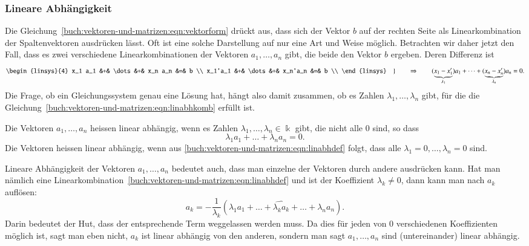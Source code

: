 \subsubsection{Lineare Abhängigkeit}
Die Gleichung~\eqref{buch:vektoren-und-matrizen:eqn:vektorform}
drückt aus, dass sich der Vektor $b$ auf der rechten Seite als
Linearkombination der Spaltenvektoren ausdrücken lässt.
Oft ist eine solche Darstellung auf nur eine Art und Weise möglich.
Betrachten wir daher jetzt den Fall, dass es zwei verschiedene
Linearkombinationen der Vektoren $a_1,\dots,a_n$ gibt, die beide den
Vektor $b$ ergeben.
Deren Differenz ist
\begin{equation}
\left.
\begin{linsys}{4}
x_1 a_1 &+& \dots &+& x_n a_n &=& b \\
x_1'a_1 &+& \dots &+& x_n'a_n &=& b \\
\end{linsys}
\quad\right\}
\qquad
\Rightarrow
\qquad
(\underbrace{x_1-x_1'}_{\lambda_1}) a_1
+
\dots
+
(\underbrace{x_n-x_n'}_{\lambda_n}) a_n
=
0.
\label{buch:vektoren-und-matrizen:eqn:linabhkomb}
\end{equation}
Die Frage, ob ein Gleichungssystem genau eine Lösung hat, hängt also
damit zusammen, ob es Zahlen $\lambda_1,\dots,\lambda_n$ gibt, für
die die Gleichung~\eqref{buch:vektoren-und-matrizen:eqn:linabhkomb}
erfüllt ist.

\begin{definition}
Die Vektoren $a_1,\dots,a_n$ heissen linear abhängig, wenn es Zahlen
$\lambda_1,\dots,\lambda_n\in\Bbbk$ gibt, die nicht alle $0$ sind, so dass
\begin{equation}
\lambda_1a_1+\dots+\lambda_na_n = 0.
\label{buch:vektoren-und-matrizen:eqn:linabhdef}
\end{equation}
Die Vektoren heissen linear abhängig, wenn aus
\eqref{buch:vektoren-und-matrizen:eqn:linabhdef}
folgt, dass alle $\lambda_1=0,\dots,\lambda_n=0$ sind.
\end{definition}

Lineare Abhängigkeit der Vektoren $a_1,\dots,a_n$ bedeutet auch, dass
man einzelne der Vektoren durch andere ausdrücken kann.
Hat man nämlich eine
Linearkombination~\eqref{buch:vektoren-und-matrizen:eqn:linabhdef} und
ist der Koeffizient $\lambda_k\ne 0$, dann kann man nach $a_k$ auflösen:
\[
a_k = -\frac{1}{\lambda_k}(\lambda_1a_1+\dots+\widehat{\lambda_ka_k}+\dots+\lambda_na_n).
\]
Darin bedeutet der Hut, dass der entsprechende Term weggelassen werden
muss.
Da dies für jeden von $0$ verschiedenen Koeffizienten möglich ist,
sagt man eben nicht, $a_k$ ist linear abhängig von den anderen, sondern
man sagt $a_1,\dots,a_n$ sind (untereinander) linear abhängig.

